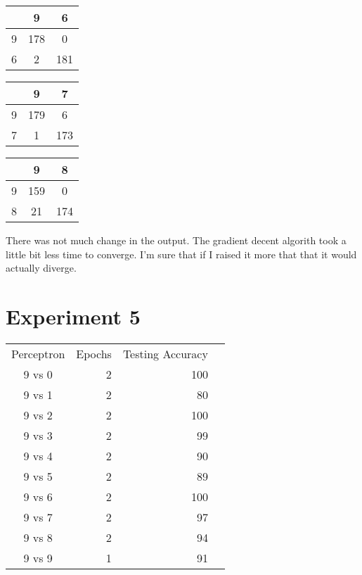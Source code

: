\documentclass[12pt]{article}
\begin{document}
\begin{multicols}{3}
			\begin{tabular}{| c | c | c |}
				\hline
				& 9 & 6 \\ 
				\hline
				9 & 178 & 0 \\ 
				\hline
				6 & 2 & 181 \\ 
				\hline
			\end{tabular}
			\newline


			\begin{tabular}{| c | c | c |}
				\hline
				& 9 & 7 \\ 
				\hline
				9 & 179 & 6 \\ 
				\hline
				7 & 1 & 173 \\ 
				\hline
			\end{tabular}
			\newline


			\begin{tabular}{| c | c | c |}
				\hline
				& 9 & 8 \\ 
				\hline
				9 & 159 & 0 \\ 
				\hline
				8 & 21 & 174 \\ 
				\hline
			\end{tabular}
			\newline
           
        \end{multicols}
        There was not much change in the output. The gradient decent algorith took a little bit less time to converge.  I'm sure that if I raised it more that
        that it would actually diverge.
    \pagebreak
    \section*{Experiment 5}
        
		\begin{tabular}{ | c || r | r | r |}
			\hline
			 Perceptron & Epochs & Testing Accuracy \\ 
			 9 vs 0 & 2 & 100 \\ 
			\hline
			 9 vs 1 & 2 & 80 \\ 
			\hline
			 9 vs 2 & 2 & 100 \\ 
			\hline
			 9 vs 3 & 2 & 99 \\ 
			\hline
			 9 vs 4 & 2 & 90 \\ 
			\hline
			 9 vs 5 & 2 & 89 \\ 
			\hline
			 9 vs 6 & 2 & 100 \\ 
			\hline
			 9 vs 7 & 2 & 97 \\ 
			\hline
			 9 vs 8 & 2 & 94 \\ 
			\hline
			 9 vs 9 & 1 & 91 \\ 
			\hline
		\end{tabular}
\end{document}
